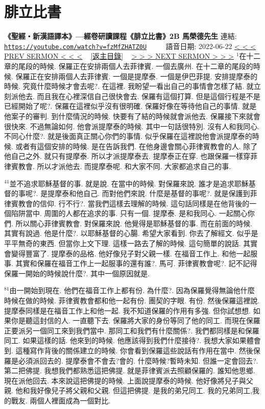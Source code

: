 \documentclass{book}
\begin{document}
\section{腓立比書}
\label{sec:fzMfZHATZ0U}
\textbf{《聖經‧新漢語譯本》—經卷研讀課程《腓立比書》2B 馬榮德先生}
\newline
\newline
連結: \href{https://youtube.com/watch?v=fzMfZHATZ0U}{\texttt{https://youtube.com/watch?v=fzMfZHATZ0U}} ~~~~ 語音日期: 2022-06-22
\newline
\newline
\hyperref[sec:XEYwTf6e19I]{\small{< < < PREV SERMON < < <}}
~
\hyperref[sec:index]{\small{[返主目錄]}}
~
\hyperref[sec:FbD104WC_Bk]{\small{> > > NEXT SERMON > > >}}
\newline
\newline
$^{1}$在十二章的尾段的時候.
保羅正在安排兩個人去菲律賓.
一個去廣州.
在十二章的尾段的時候.
保羅正在安排兩個人去菲律賓.
一個是提摩泰.
一個是伊巴菲提.
安排提摩泰的時候.
究竟什麼時候才會去呢?.
在這裡.
我盼望一看出自己的事情會怎樣了結.
就立刻派他去.
而且我在心裡深信自己很快會去.
保羅有這個打算.
但是這個行程是不是已經開始了呢?.
保羅在這裡似乎沒有很明確.
保羅好像在等待他自己的事情.
就是他案子的審判.
到什麼情況的時候.
快要有了結的時候就會派他去.
保羅接下來就會很快來.
不過無論如何.
他會派提摩泰的時候.
其中一句話很特別.
沒有人和我同心.
不同心什麼?.
就是後面真正關心你們的事情.
似乎保羅在這裡說他會派提摩泰的時候.
或者有這個安排的時候.
是在告訴我們.
在他身邊會關心菲律賓教會的人.
除了他自己之外.
就只有提摩泰.
所以才派提摩泰去.
提摩泰正在穿.
也跟保羅一樣穿菲律賓教會.
所以才派他去.
而提摩泰呢.
和大家不同.
大家都追求自己的事.

$^{41}$並不追求耶穌基督的事.
就是說.
在當中的時候.
對保羅來說.
誰才是追求耶穌基督的事呢?.
是提摩泰和他自己.
而對他們來說.
什麼是基督的事呢?.
就是保護到菲律賓教會的信仰.
行不行?.
當我們這樣去理解的時候.
這句話同樣是在他背後的一個陷阱當中.
周圍的人都在追求的事.
只有一個.
提摩泰.
是和我同心.
一起關心你們.
所以關心菲律賓教會.
對保羅來說.
他覺得是耶穌基督的事.
而在前面的時候.
其實有說過.
他是什麼?.
以耶穌基督的心腸.
希望大家看到.
你去了解經文.
似乎是平平無奇的東西.
但當你上文下理.
這樣一路去了解的時候.
這句簡單的說話.
其實會變得豐富了.
提摩泰的品格.
他好像兒子對父親一樣.
在福音工作上.
和他一起服事.
其實和保羅在福音工作上一起服事的還有誰?.
馬可.
菲律賓教會呢?.
記不記得保羅一開始的時候說什麼?.
其中一個原因就是.

$^{81}$由一開始到現在.
他們在福音工作上都有份.
為什麼?.
因為保羅覺得無論他什麼時候在做的時候.
菲律賓教會都和他一起有份.
團契的字眼.
有份.
然後保羅這裡說.
提摩泰同樣是在福音工作上和他一起.
我不知道保羅的作用有多強.
但你試想想.
如果你是聽這封信的人.
一直聽下去.
保羅將大家的身份等同了他的同工.
而現在保羅正要派另一個同工來到我們當中.
那同工和我們有什麼關係?.
我們都同樣是和保羅同工.
如果這樣的話.
他來到的時候.
他應該得到我們什麼接待?.
我想大家如果體會到.
這種寫作背後的關係建立的時候.
你會看到保羅這些說話有作用在當中.
然後保羅是必須派回去的.
提摩泰會不會去?會的.
什麼時候?暫時未知.
但誰一定會回去?.
第二把佛提.
我想我們都熟悉這把佛提.
就是菲律賓派去照顧保羅的.
誰知他思鄉.
現在派他回去.
本來說這把佛提的時候.
上面說提摩泰的時候.
他好像將兒子與父親.
他和我好像兒子將父親和父親.
但這把佛提.
是我的弟兄同工.
我的兄弟同工,我的戰友.
兩個人裡面成為一個對比.
\end{document}
